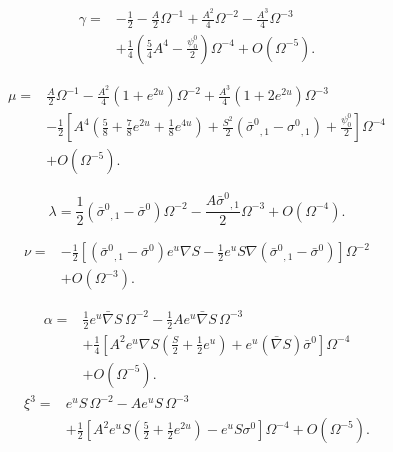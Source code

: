 \begin{equation}
\begin{aligned}
\gamma
={}&
-\frac{1}{2}
-\frac{A}{2}\Omega^{-1}
+\frac{A^2}{4}\Omega^{-2}
-\frac{A^3}{4}\Omega^{-3}
\\
&+
\frac{1}{4}
\left(
\frac{5}{4}A^4
-\frac{\psi_0^0}{2}
\right)\Omega^{-4}
+
O(\Omega^{-5}).
\end{aligned}
\tag{7.27}
\end{equation}

\begin{equation}
\begin{aligned}
\mu
={}&
\frac{A}{2}\Omega^{-1}
-
\frac{A^2}{4}
\left(
1+e^{2u}
\right)\Omega^{-2}
+
\frac{A^3}{4}
\left(
1+2e^{2u}
\right)\Omega^{-3}
\\
&-
\frac{1}{2}
\left[
A^4
\left(
\frac{5}{8}
+\frac{7}{8}e^{2u}
+\frac{1}{8}e^{4u}
\right)
+
\frac{S^2}{2}
\left(
\bar{\sigma}^0{}_{,1}
-
\sigma^0{}_{,1}
\right)
+
\frac{\psi_0^0}{2}
\right]\Omega^{-4}
\\
&+
O(\Omega^{-5}).
\end{aligned}
\tag{7.28}
\end{equation}

\begin{equation}
\lambda
=
\frac{1}{2}
\left(
\bar{\sigma}^0{}_{,1}
-
\bar{\sigma}^0
\right)\Omega^{-2}
-
\frac{A\bar{\sigma}^0{}_{,1}}{2}\Omega^{-3}
+
O(\Omega^{-4}).
\tag{7.29}
\end{equation}

\begin{equation}
\begin{aligned}
\nu
={}&
-\frac{1}{2}
\left[
\left(
\bar{\sigma}^0{}_{,1}
-
\bar{\sigma}^0
\right)e^u\nabla S
-
\frac{1}{2}e^uS
\nabla
\left(
\bar{\sigma}^0{}_{,1}
-
\bar{\sigma}^0
\right)
\right]\Omega^{-2}
\\
&+
O(\Omega^{-3}).
\end{aligned}
\tag{7.30}
\end{equation}

\begin{equation}
\begin{aligned}
\alpha
={}&
\frac{1}{2}e^u\bar{\nabla}S\,\Omega^{-2}
-
\frac{1}{2}Ae^u\bar{\nabla}S\,\Omega^{-3}
\\
&+
\frac{1}{4}
\left[
A^2e^u\nabla S
\left(
\frac{S}{2}
+
\frac{1}{2}e^u
\right)
+
e^u(\bar{\nabla}S)\bar{\sigma}^0
\right]\Omega^{-4}
\\
&+
O(\Omega^{-5}).
\end{aligned}
\tag{7.31}
\end{equation}
\begin{equation}
\begin{aligned}
\xi^3
={}&
e^u S\,\Omega^{-2}
-
Ae^u S\,\Omega^{-3}
\\
&+
\frac{1}{2}
\left[
A^2e^u S
\left(
\frac{5}{2}
+
\frac{1}{2}e^{2u}
\right)
-
e^u S\sigma^0
\right]\Omega^{-4}
+
O(\Omega^{-5}).
\end{aligned}
\tag{7.32}
\end{equation}

